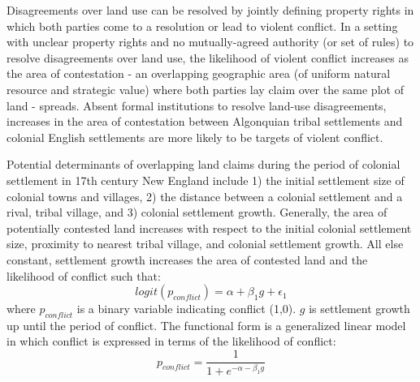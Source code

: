\documentclass[sn-mathphys]{sn-jnl}%
\theoremstyle{thmstyleone}%
\theoremstyle{thmstyletwo}%
\theoremstyle{thmstylethree}%
\begin{document}
Disagreements over land use can be resolved by jointly defining property rights in which both parties come to a resolution or lead to violent conflict. In a setting with unclear property rights and no mutually-agreed authority (or set of rules) to resolve disagreements over land use, the likelihood of violent conflict increases as the area of contestation - an overlapping geographic area (of uniform natural resource and strategic value) where both parties lay claim over the same plot of land - spreads. Absent formal institutions to resolve land-use disagreements, increases in the area of contestation between Algonquian tribal settlements and colonial English settlements are more likely to be targets of violent conflict.

Potential determinants of overlapping land claims during the period of colonial settlement in 17th century New England include 1) the initial settlement size of colonial towns and villages, 2) the distance between a colonial settlement and a rival, tribal village, and 3) colonial settlement growth. Generally, the area of potentially contested land increases with respect to the initial colonial settlement size, proximity to nearest tribal village, and colonial settlement growth. All else constant, settlement growth increases the area of contested land and the likelihood of conflict such that: 
\begin{equation}
logit(p_{conflict})= \alpha + \beta_{1}g + \epsilon_{1} 
\end{equation}
where $p_{conflict}$ is a binary variable indicating conflict (1,0). $g$ is settlement growth up until the period of conflict. The functional form is a generalized linear model in which conflict is expressed in terms of the likelihood of conflict:
\begin{equation}
p_{conflict}=\frac{1}{1+e^{-\alpha-\beta_{1}g}}
\end{equation}
\end{document}
